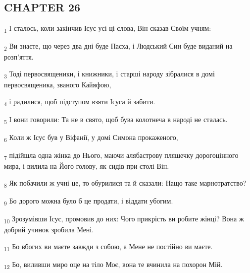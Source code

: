 \subsection{CHAPTER 26}
\begin{tcolorbox}
\textsubscript{1} І сталось, коли закінчив Ісус усі ці слова, Він сказав Своїм учням:
\end{tcolorbox}
\begin{tcolorbox}
\textsubscript{2} Ви знаєте, що через два дні буде Пасха, і Людський Син буде виданий на розп'яття.
\end{tcolorbox}
\begin{tcolorbox}
\textsubscript{3} Тоді первосвященики, і книжники, і старші народу зібралися в домі первосвященика, званого Кайяфою,
\end{tcolorbox}
\begin{tcolorbox}
\textsubscript{4} і радилися, щоб підступом взяти Ісуса й забити.
\end{tcolorbox}
\begin{tcolorbox}
\textsubscript{5} І вони говорили: Та не в свято, щоб бува колотнеча в народі не сталась.
\end{tcolorbox}
\begin{tcolorbox}
\textsubscript{6} Коли ж Ісус був у Віфанії, у домі Симона прокаженого,
\end{tcolorbox}
\begin{tcolorbox}
\textsubscript{7} підійшла одна жінка до Нього, маючи алябастрову пляшечку дорогоцінного мира, і вилила на Його голову, як сидів при столі Він.
\end{tcolorbox}
\begin{tcolorbox}
\textsubscript{8} Як побачили ж учні це, то обурилися та й сказали: Нащо таке марнотратство?
\end{tcolorbox}
\begin{tcolorbox}
\textsubscript{9} Бо дорого можна було б це продати, і віддати убогим.
\end{tcolorbox}
\begin{tcolorbox}
\textsubscript{10} Зрозумівши Ісус, промовив до них: Чого прикрість ви робите жінці? Вона ж добрий учинок зробила Мені.
\end{tcolorbox}
\begin{tcolorbox}
\textsubscript{11} Бо вбогих ви маєте завжди з собою, а Мене не постійно ви маєте.
\end{tcolorbox}
\begin{tcolorbox}
\textsubscript{12} Бо, виливши миро оце на тіло Моє, вона те вчинила на похорон Мій.
\end{tcolorbox}
